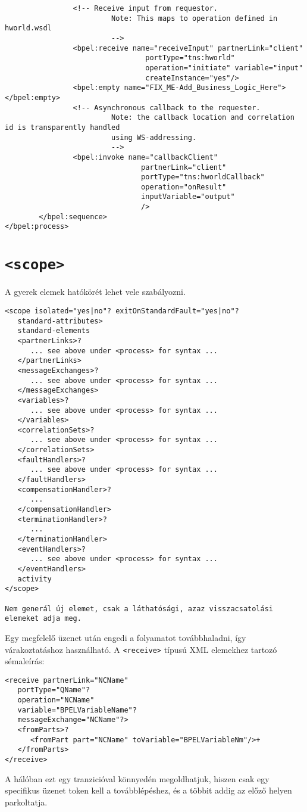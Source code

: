 \begin{verbatim}
				<!-- Receive input from requestor. 
						 Note: This maps to operation defined in hworld.wsdl 
						 -->
				<bpel:receive name="receiveInput" partnerLink="client"
								 portType="tns:hworld"
								 operation="initiate" variable="input"
								 createInstance="yes"/>
				<bpel:empty name="FIX_ME-Add_Business_Logic_Here"></bpel:empty>
				<!-- Asynchronous callback to the requester.
						 Note: the callback location and correlation id is transparently handled 
						 using WS-addressing.
						 -->
				<bpel:invoke name="callbackClient" 
								partnerLink="client"
								portType="tns:hworldCallback"
								operation="onResult" 
								inputVariable="output"
								/>
		</bpel:sequence>
</bpel:process>
\end{verbatim}
\section{\texttt{<scope>}}

A gyerek elemek hatókörét lehet vele szabályozni.
\begin{verbatim}
<scope isolated="yes|no"? exitOnStandardFault="yes|no"?
   standard-attributes>
   standard-elements
   <partnerLinks>?
      ... see above under <process> for syntax ...
   </partnerLinks>
   <messageExchanges>?
      ... see above under <process> for syntax ...
   </messageExchanges>
   <variables>?
      ... see above under <process> for syntax ...
   </variables>
   <correlationSets>?
      ... see above under <process> for syntax ...
   </correlationSets>
   <faultHandlers>?
      ... see above under <process> for syntax ...
   </faultHandlers>
   <compensationHandler>?
      ...
   </compensationHandler>
   <terminationHandler>?
      ...
   </terminationHandler>
   <eventHandlers>?
      ... see above under <process> for syntax ...
   </eventHandlers>
   activity
</scope>

Nem generál új elemet, csak a láthatósági, azaz visszacsatolási elemeket adja meg. 
\end{verbatim}

Egy megfelelő üzenet után engedi a folyamatot továbbhaladni, így várakoztatáshoz használható. A \texttt{<receive>} típusú XML elemekhez tartozó sémaleírás:\\
\begin{verbatim}
<receive partnerLink="NCName"
   portType="QName"?
   operation="NCName"
   variable="BPELVariableName"?
   messageExchange="NCName"?>
   <fromParts>?
      <fromPart part="NCName" toVariable="BPELVariableNm"/>+
   </fromParts>
</receive>
\end{verbatim}
A hálóban ezt egy tranzicióval könnyedén megoldhatjuk, hiszen csak egy specifikus üzenet token kell a továbblépéshez, és a többit addig az előző helyen parkoltatja. 

